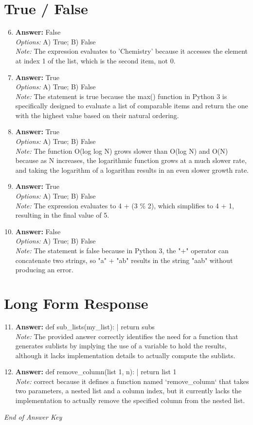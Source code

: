 \documentclass[12pt]{article}
\begin{document}
\section*{True / False}
\begin{enumerate}[label=\arabic*.]
\setcounter{enumi}{5}
\item \textbf{Answer:} False
\\ \textit{Options:} A) True; B) False
\\ \textit{Note:} The expression evaluates to 'Chemistry' because it accesses the element at index 1 of the list, which is the second item, not 0.
\item \textbf{Answer:} True
\\ \textit{Options:} A) True; B) False
\\ \textit{Note:} The statement is true because the max() function in Python 3 is specifically designed to evaluate a list of comparable items and return the one with the highest value based on their natural ordering.
\item \textbf{Answer:} True
\\ \textit{Options:} A) True; B) False
\\ \textit{Note:} The function O(log log N) grows slower than O(log N) and O(N) because as N increases, the logarithmic function grows at a much slower rate, and taking the logarithm of a logarithm results in an even slower growth rate.
\item \textbf{Answer:} True
\\ \textit{Options:} A) True; B) False
\\ \textit{Note:} The expression evaluates to 4 + (3 \% 2), which simplifies to 4 + 1, resulting in the final value of 5.
\item \textbf{Answer:} False
\\ \textit{Options:} A) True; B) False
\\ \textit{Note:} The statement is false because in Python 3, the "+" operator can concatenate two strings, so "a" + "ab" results in the string "aab" without producing an error.
\end{enumerate}

\section*{Long Form Response}
\begin{enumerate}[label=\arabic*.]
\setcounter{enumi}{10}
\item \textbf{Answer:} def sub\_lists(my\_list): | return subs
\\ \textit{Note:} The provided answer correctly identifies the need for a function that generates sublists by implying the use of a variable to hold the results, although it lacks implementation details to actually compute the sublists.
\item \textbf{Answer:} def remove\_column(list 1, n): | return list 1
\\ \textit{Note:} correct because it defines a function named `remove\_column` that takes two parameters, a nested list and a column index, but it currently lacks the implementation to actually remove the specified column from the nested list.
\end{enumerate}

\vfill
\noindent\textit{End of Answer Key}
\end{document}
